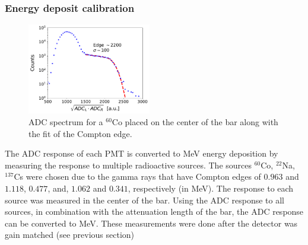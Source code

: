\documentclass[3p,final,twocolumn]{elsarticle}
\begin{document}
\subsubsection{Energy deposit calibration}
\label{sec:energydeposit}
\begin{figure}[tbh]
	\centering
		\includegraphics[width=0.48\textwidth]{cobaltfit.pdf}
		\caption{ADC spectrum for a $^{60}$Co placed on the center of the bar along with the fit of the Compton edge.}
	\label{fig:compton_edge}
\end{figure}


The ADC response of each PMT is converted to \si{\mega\electronvolt} energy deposition by measuring the response to 
multiple radioactive sources. The sources $^{60}$Co, $^{22}$Na, $^{137}$Cs were chosen due to the gamma rays that have 
Compton edges of $0.963$ and $1.118$, $0.477$, and, $1.062$ and $0.341$, respectively (in \si{\mega\electronvolt}). The 
response to each source was measured in the center of the bar. Using the ADC response to all sources, in combination with the 
attenuation length of the bar, the ADC response can be converted to \si{\mega\electronvolt}. These measurements were done after the detector was gain matched (see previous section)
\end{document}
